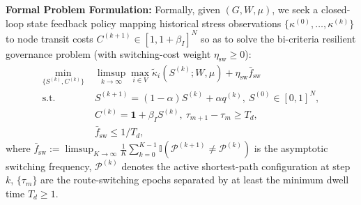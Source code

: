\documentclass[journal]{IEEEtran}
\theoremstyle{plain}
\theoremstyle{definition}
\newcommand{\rev}[1]{{\color{blue}#1}}
\begin{document}
\rev{\textbf{Formal Problem Formulation:} Formally, given $(G, W, \mu)$, we seek a closed-loop state feedback policy mapping historical stress observations $\{\kappa^{(0)}, \dots, \kappa^{(k)}\}$ to node transit costs $C^{(k+1)} \in [1, 1+\beta_I]^N$ so as to solve the bi-criteria resilient governance problem (with switching-cost weight $\eta_{\text{sw}} \ge 0$):
\begin{equation}
    \label{eq:problem_formulation}
    \begin{aligned}
    \min_{\{S^{(k)}, C^{(k)}\}}\; & \limsup_{k \to \infty} \max_{i \in V} \widetilde{\kappa}_i(S^{(k)}; W, \mu) + \eta_{\text{sw}}\bar{f}_{\text{sw}} \\
    \text{s.t.}\; & S^{(k+1)} = (1-\alpha)S^{(k)} + \alpha q^{(k)},\ S^{(0)} \in [0,1]^N, \\
    & C^{(k)} = \mathbf{1} + \beta_I S^{(k)},\ \tau_{m+1} - \tau_m \ge T_d, \\
    & \bar{f}_{\text{sw}} \le 1/T_d,
    \end{aligned}
\end{equation}
where $\bar{f}_{\text{sw}} := \limsup_{K\to\infty}\frac{1}{K}\sum_{k=0}^{K-1}\mathbb{I}(\mathcal{P}^{(k+1)}\neq\mathcal{P}^{(k)})$ is the asymptotic switching frequency, $\mathcal{P}^{(k)}$ denotes the active shortest-path configuration at step $k$, $\{\tau_m\}$ are the route-switching epochs separated by at least the minimum dwell time $T_d \ge 1$.}
\end{document}
